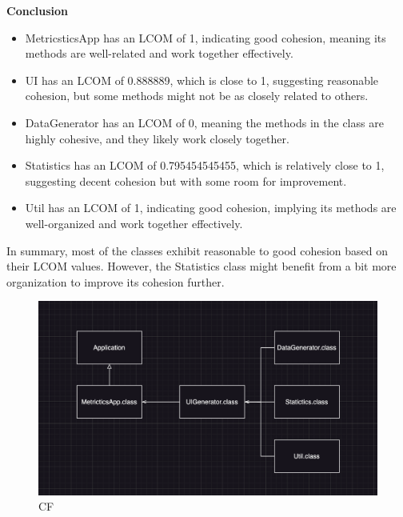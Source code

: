 \documentclass[12pt,letterpaper]{report}
\begin{document}
\vspace{5mm}
\textbf{Conclusion} \\


\begin{itemize}
        \item MetricsticsApp has an LCOM of 1, indicating good cohesion, meaning its methods are well-related and work together effectively.
        \item UI has an LCOM of 0.888889, which is close to 1, suggesting reasonable cohesion, but some methods might not be as closely related to others.
        \item DataGenerator has an LCOM of 0, meaning the methods in the class are highly cohesive, and they likely work closely together.
        \item Statistics has an LCOM of 0.795454545455, which is relatively close to 1, suggesting decent cohesion but with some room for improvement.
        \item Util has an LCOM of 1, indicating good cohesion, implying its methods are well-organized and work together effectively.
    \end{itemize} 
\vspace{10mm} In summary, most of the classes exhibit reasonable to good cohesion based on their LCOM values. However, the Statistics class might benefit from a bit more organization to improve its cohesion further. 















\begin{figure}
    \begin{center}
    \includegraphics[width=0.5\linewidth]{CF.png}
    \end{center}
       \caption{CF \label{Code Sample}}
\end{figure}
\end{document}
